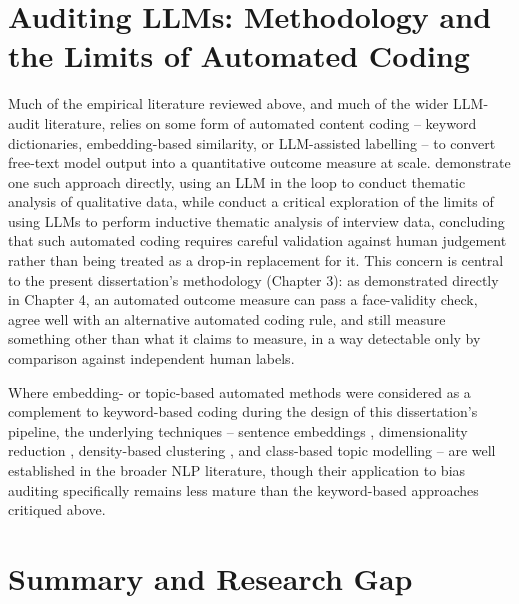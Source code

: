 \section{Auditing LLMs: Methodology and the Limits of Automated Coding}

Much of the empirical literature reviewed above, and much of the wider LLM-audit literature, relies on some form of automated content coding -- keyword dictionaries, embedding-based similarity, or LLM-assisted labelling -- to convert free-text model output into a quantitative outcome measure at scale. \citet{dai2023llm} demonstrate one such approach directly, using an LLM in the loop to conduct thematic analysis of qualitative data, while \citet{depaoli2024thematic} conduct a critical exploration of the limits of using LLMs to perform inductive thematic analysis of interview data, concluding that such automated coding requires careful validation against human judgement rather than being treated as a drop-in replacement for it. This concern is central to the present dissertation's methodology (Chapter 3): as demonstrated directly in Chapter 4, an automated outcome measure can pass a face-validity check, agree well with an alternative automated coding rule, and still measure something other than what it claims to measure, in a way detectable only by comparison against independent human labels.

Where embedding- or topic-based automated methods were considered as a complement to keyword-based coding during the design of this dissertation's pipeline, the underlying techniques -- sentence embeddings \citep{reimers2019sentencebert}, dimensionality reduction \citep{mcinnes2018umap}, density-based clustering \citep{campello2013density}, and class-based topic modelling \citep{grootendorst2022bertopic} -- are well established in the broader NLP literature, though their application to bias auditing specifically remains less mature than the keyword-based approaches critiqued above.

\section{Summary and Research Gap}

